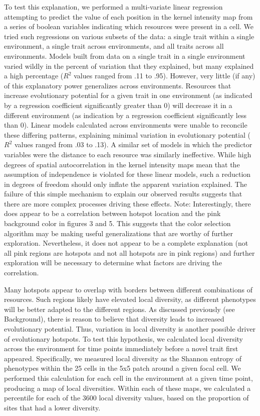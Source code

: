 To test this explanation, we performed a multi-variate linear regression attempting to predict the value of each position in the kernel intensity map from a series of boolean variables indicating which resources were present in a cell. We tried such regressions on various subsets of the data: a single trait within a single environment, a single trait across environments, and all traits across all environments. Models built from data on a single trait in a single environment varied wildly in the percent of variation that they explained, but many explained a high percentage ($R^{2}$ values ranged from .11 to .95). However, very little (if any) of this explanatory power generalizes across environments. Resources that increase evolutionary potential for a given trait in one environment (as indicated by a regression coefficient significantly greater than 0) will decrease it in a different environment (as indication by a regression coefficient significantly less than 0). Linear models calculated across environments were unable to reconcile these differing patterns, explaining minimal variation in evolutionary potential ($R^{2}$ values ranged from .03 to .13). A similar set of models in which the predictor variables were the distance to each resource was similarly ineffective. While high degrees of spatial autocorrelation in the kernel intensity maps mean that the assumption of independence is violated for these linear models, such a reduction in degrees of freedom should only inflate the apparent variation explained. The failure of this simple mechanism to explain our observed results suggests that there are more complex processes driving these effects. Note: Interestingly, there does appear to be a correlation between hotspot location and the pink background color in figures 3 and 5. This suggests that the color selection algorithm may be making useful generalizations that are worthy of further exploration. Nevertheless, it does not appear to be a complete explanation (not all pink regions are hotspots and not all hotspots are in pink regions) and further exploration will be necessary to determine what factors are driving the correlation. 

Many hotspots appear to overlap with borders between different combinations of resources. Such regions likely have elevated local diversity, as different phenotypes will be better adapted to the different regions. As discussed previously (see Background), there is reason to believe that diversity leads to increased evolutionary potential. Thus, variation in local diversity is another possible driver of evolutionary hotspots. To test this hypothesis, we calculated local diversity across the environment for time points immediately before a novel trait first appeared. Specifically, we measured local diversity as the Shannon entropy of phenotypes within the 25 cells in the 5x5 patch around a given focal cell. We performed this calculation for each cell in the environment at a given time point, producing a map of local diversities. Within each of these maps, we calculated a percentile for each of the 3600 local diversity values, based on the proportion of sites that had a lower diversity.



